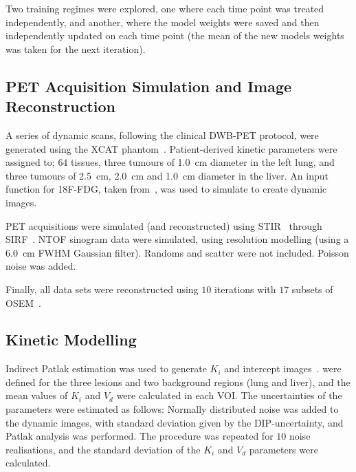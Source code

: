                 Two training regimes were explored, one where each time point was treated independently, and another, where the model weights were saved and then independently updated on each time point (the mean of the new models weights was taken for the next iteration).
                
            
            \subsection{PET Acquisition Simulation and Image Reconstruction} \label{sec:pseudo_bayesian_dip_denoising_as_a_preprocessing_step_for_kinetic_modelling_in_dynamic_pet_appendix_methods_pet_acquisition_simulation_and_image_reconstruction}
                A series of dynamic scans, following the clinical \gls{DWB}-\gls{PET} protocol, were generated using the \gls{XCAT} phantom~\parencite{Segars2010}. Patient-derived kinetic parameters were assigned to; $64$ tissues, three tumours of \SI{1.0}{\centi\meter} diameter in the left lung, and three tumours of \SI{2.5}{\centi\meter}, \SI{2.0}{\centi\meter} and \SI{1.0}{\centi\meter} diameter in the liver. An input function for \gls{18F-FDG}, taken from~\parencite{Langsjo2004EffectsHumans}, was used to simulate  to create dynamic images.
        
                \gls{PET} acquisitions were simulated (and reconstructed) using \gls{STIR}~\parencite{Thielemans2012} through \gls{SIRF}~\parencite{Ovtchinnikov2017}. \gls{NTOF} sinogram data were simulated, using resolution modelling (using a \SI{6.0}{\centi\meter} \gls{FWHM} Gaussian filter). Randoms and scatter were not included. Poisson noise was added.%
        
                Finally, all data sets were reconstructed using $10$ iterations with $17$ subsets of \gls{OSEM}~\parencite{Hudson1994}.
        
            
            \subsection{Kinetic Modelling} \label{sec:pseudo_bayesian_dip_denoising_as_a_preprocessing_step_for_kinetic_modelling_in_dynamic_pet_appendix_methods_kinetic_modelling}
                Indirect Patlak estimation was used to generate $K_i$ and intercept images~\parencite{Patlak1983GraphicalData}.  were defined for the three lesions and two background regions (lung and liver), and the mean values of $K_i$ and $V_d$ were calculated in each \gls{VOI}. The uncertainties of the parameters were estimated as follows: Normally distributed noise was added to the dynamic images, with standard deviation given by the \gls{DIP}-uncertainty, and Patlak analysis was performed. The procedure was repeated for $10$ noise realisations, and the standard deviation of the $K_i$ and $V_d$ parameters were calculated.
                
